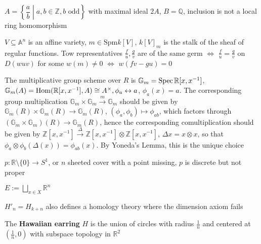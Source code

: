 \documentclass[main]{subfiles}
\begin{document}
\begin{example}
$A=\left\{\dfrac{a}{b}\middle|a,b\in\mathbb Z,b\text{ odd}\right\}$ with maximal ideal $2A$, $B=\mathbb Q$, inclusion is not a local ring homomorphism
\end{example}

\begin{example}
$V\subseteq\mathbb A^n$ is an affine variety, $m\in\mathrm{Spm}k[V]$, $k[V]_{m}$ is the stalk of the sheaf of regular functions. Tow representatives $\frac{f}{u},\frac{g}{v}$ are of the same germ $\Leftrightarrow$ $\frac{f}{u}=\frac{g}{v}$ on $D(wuv)$ for some $w(m)\neq 0$ $\Leftrightarrow$ $w(fv-gu)=0$
\end{example}

\begin{example}
The multiplicative group scheme over $R$ is $\mathbb G_m=\operatorname{Spec}\mathbb R[x,x^{-1}]$, $\mathbb G_m(A)=\operatorname{Hom}(\mathbb R[x,x^{-1}],A)\cong A^\times, \phi_a\leftrightarrow a$, $\phi_a(x)=a$. The corresponding group multiplication $\mathbb G_m\times\mathbb G_m\xrightarrow m\mathbb G_m$ should be given by $\mathbb G_m(R)\times\mathbb G_m(R)\to\mathbb G_m(R)$, $(\phi_a,\phi_b)\mapsto\phi_{ab}$, which factors through $(\mathbb G_m\times\mathbb G_m)(R)\to\mathbb G_m(R)$, hence the corresponding comultiplication should be given by $\mathbb Z[x,x^{-1}]\xrightarrow\Delta\mathbb Z[x,x^{-1}]\otimes\mathbb Z[x,x^{-1}]$, $\Delta x=x\otimes x$, so that $\phi_a\otimes\phi_b(\Delta(x))=\phi_{ab}(x)$. By Yoneda's Lemma, this is the unique choice
\end{example}

\begin{example}
$p:\mathbb R\setminus\{0\}\to S^1$, or $n$ sheeted cover with a point missing, $p$ is discrete but not proper
\end{example}

\begin{example}
$E:=\displaystyle\bigsqcup_{x\in X}\mathbb R^n$
\end{example}

\begin{example}
$H'_n=H_{k+n}$ also defines a homology theory where the dimension axiom fails
\end{example}

\begin{example}\label{Hawaiian earring}
The \textbf{Hawaiian earring} $H$ is the union of circles with radius $\frac{1}{n}$ and centered at $(\frac{1}{n},0)$ with subspace topology in $\mathbb R^2$
\begin{center}
\end{center}
\end{example}
\end{document}
